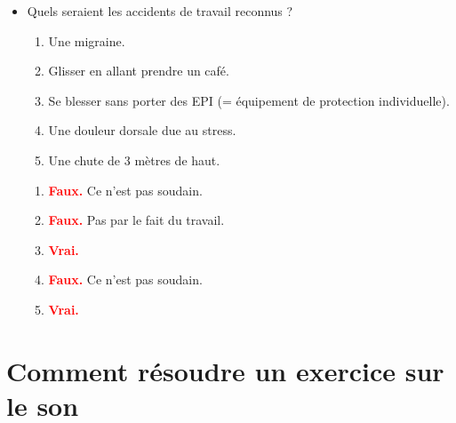\documentclass[class=article, crop=false]{standalone}
\begin{document}
\begin{itemize}
\item Quels seraient les accidents de travail reconnus ?
\begin{enumerate}
    \item Une migraine.
    \item Glisser en allant prendre un café.
    \item Se blesser sans porter des EPI (= équipement de protection individuelle).
    \item Une douleur dorsale due au stress.
    \item Une chute de 3 mètres de haut.
\end{enumerate}
\begin{example}
\begin{enumerate}
    \item \textcolor{red}{\textbf{Faux.}} Ce n'est pas soudain.
    \item \textcolor{red}{\textbf{Faux.}} Pas par le fait du travail.
    \item \textcolor{red}{\textbf{Vrai.}}
    \item \textcolor{red}{\textbf{Faux.}} Ce n'est pas soudain.
    \item \textcolor{red}{\textbf{Vrai.}}
\end{enumerate}
\end{example}





\end{itemize}















\newpage \section{Comment résoudre un exercice sur le son}
\end{document}
